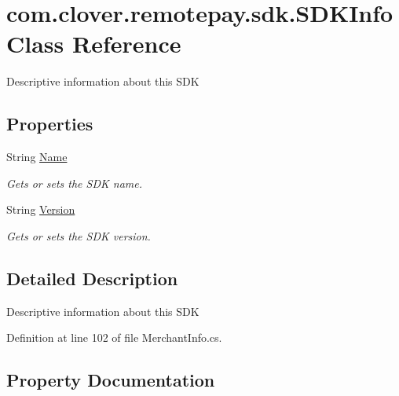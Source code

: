 \hypertarget{classcom_1_1clover_1_1remotepay_1_1sdk_1_1_s_d_k_info}{}\section{com.\+clover.\+remotepay.\+sdk.\+S\+D\+K\+Info Class Reference}
\label{classcom_1_1clover_1_1remotepay_1_1sdk_1_1_s_d_k_info}


Descriptive information about this S\+DK  


\subsection*{Properties}
\begin{DoxyCompactItemize}
\item 
String \hyperlink{classcom_1_1clover_1_1remotepay_1_1sdk_1_1_s_d_k_info_ae3c93c8379ce095c0371ced07d92d715}{Name}
\begin{DoxyCompactList}\small\item\em Gets or sets the S\+DK name. \end{DoxyCompactList}\item 
String \hyperlink{classcom_1_1clover_1_1remotepay_1_1sdk_1_1_s_d_k_info_a48f760a4186c72115f1e00bc4446ce09}{Version}
\begin{DoxyCompactList}\small\item\em Gets or sets the S\+DK version. \end{DoxyCompactList}\end{DoxyCompactItemize}


\subsection{Detailed Description}
Descriptive information about this S\+DK 



Definition at line 102 of file Merchant\+Info.\+cs.



\subsection{Property Documentation}
\mbox{\label{classcom_1_1clover_1_1remotepay_1_1sdk_1_1_s_d_k_info_ae3c93c8379ce095c0371ced07d92d715}} 
